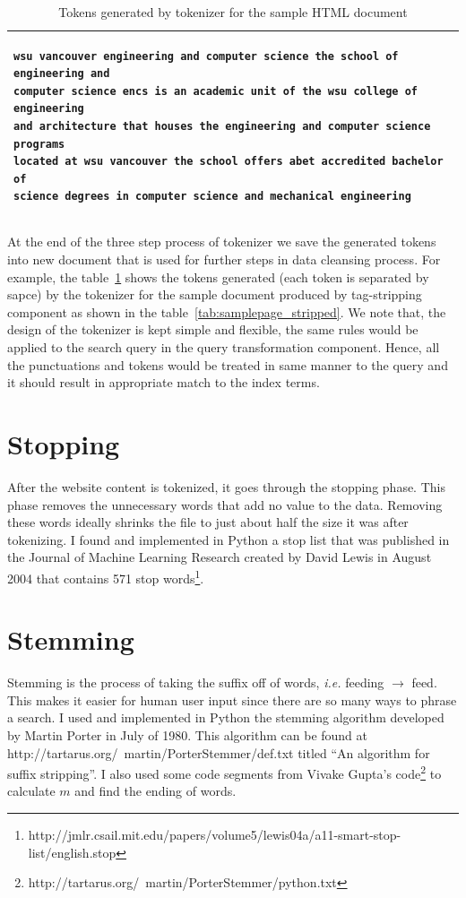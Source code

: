 \documentclass[letterpaper,11pt,twoside]{article}
\begin{document}
\begin{table}[htb]
\centering
\begin{tabular}{|p{\textwidth}|}
\hline
\begin{verbatim}
wsu vancouver engineering and computer science the school of engineering and
computer science encs is an academic unit of the wsu college of engineering
and architecture that houses the engineering and computer science programs
located at wsu vancouver the school offers abet accredited bachelor of
science degrees in computer science and mechanical engineering
\end{verbatim}\\
\hline
\end{tabular}
\caption{Tokens generated by tokenizer for the sample HTML document}
\label{tab:samplepage_tokenized}
\end{table}

At the end of the three step process of tokenizer we save the generated tokens into new document that is used for further steps in data cleansing process. For example, the table~\ref{tab:samplepage_tokenized} shows the tokens generated (each token is separated by sapce) by the tokenizer for the sample document produced by tag-stripping component as shown in the table~\ref{tab:samplepage_stripped}. We note that, the design of the tokenizer is kept simple and flexible, the same rules would be applied to the search query in the query transformation component. Hence, all the punctuations and tokens would be treated in same manner to the query and it should result in appropriate match to the index terms. 

\section{Stopping}
After the website content is tokenized, it goes through the stopping phase. This phase removes the unnecessary words that add no value to the data. Removing these words ideally shrinks the file to just about half the size it was after tokenizing. I found and implemented in Python a stop list that was published in the Journal of Machine Learning Research created by David Lewis in August 2004 that contains 571 stop words\footnote{http://jmlr.csail.mit.edu/papers/volume5/lewis04a/a11-smart-stop-list/english.stop}.

\section{Stemming}
Stemming is the process of taking the suffix off of words, \emph{i.e.} feeding $\rightarrow$ feed. This makes it easier for human user input since there are so many ways to phrase a search. I used and implemented in Python the stemming algorithm developed by Martin Porter in July of 1980. This algorithm can be found at http://tartarus.org/~martin/PorterStemmer/def.txt  titled ``An algorithm for suffix stripping''.  I also used some code segments from Vivake Gupta’s code\footnote{http://tartarus.org/~martin/PorterStemmer/python.txt} to calculate $m$ and find the ending of words.
\end{document}
